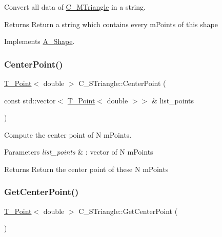 Convert all data of \hyperlink{classC__MTriangle}{C\+\_\+\+M\+Triangle} in a string. 

\begin{DoxyReturn}{Returns}
Return a string which contains every m\+Points of this shape 
\end{DoxyReturn}


Implements \hyperlink{classA__Shape_ad8804b4e74543db374af6892367b7c2e}{A\+\_\+\+Shape}.

\mbox{\label{classC__STriangle_a98c01a7d57aeee85ee4e2df88a786b7f}} 
\subsubsection{\texorpdfstring{Center\+Point()}{CenterPoint()}}
{\footnotesize\ttfamily \hyperlink{classT__Point}{T\+\_\+\+Point}$<$ double $>$ C\+\_\+\+S\+Triangle\+::\+Center\+Point (\begin{DoxyParamCaption}\item[{const std\+::vector$<$ \hyperlink{classT__Point}{T\+\_\+\+Point}$<$ double $>$$>$ \&}]{list\+\_\+points }\end{DoxyParamCaption})\hspace{0.3cm}{\ttfamily [static]}}



Compute the center point of N m\+Points. 


\begin{DoxyParams}{Parameters}
{\em list\+\_\+points} & \+: vector of N m\+Points \\
\hline
\end{DoxyParams}
\begin{DoxyReturn}{Returns}
Return the center point of these N m\+Points 
\end{DoxyReturn}
\mbox{\label{classC__STriangle_ac9b374f16313b3c99eca7fe615d14851}} 
\subsubsection{\texorpdfstring{Get\+Center\+Point()}{GetCenterPoint()}}
{\footnotesize\ttfamily \hyperlink{classT__Point}{T\+\_\+\+Point}$<$ double $>$ C\+\_\+\+S\+Triangle\+::\+Get\+Center\+Point (\begin{DoxyParamCaption}{ }\end{DoxyParamCaption})}



